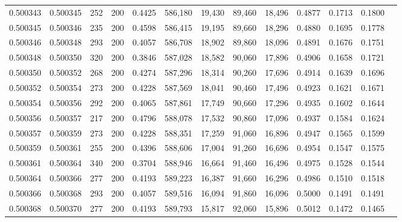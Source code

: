 \begin{tabular}{rrrrrrrrrrrrr}
0.500343 & 0.500345 &    252 & 200 &                                     0.4425 & 586,180 &  19,430 &  89,460 &  18,496 & 0.4877 & 0.1713 & 0.1800 \\
0.500345 & 0.500346 &    235 & 200 &                                     0.4598 & 586,415 &  19,195 &  89,660 &  18,296 & 0.4880 & 0.1695 & 0.1778 \\
0.500346 & 0.500348 &    293 & 200 &                                     0.4057 & 586,708 &  18,902 &  89,860 &  18,096 & 0.4891 & 0.1676 & 0.1751 \\
0.500348 & 0.500350 &    320 & 200 &                                     0.3846 & 587,028 &  18,582 &  90,060 &  17,896 & 0.4906 & 0.1658 & 0.1721 \\
0.500350 & 0.500352 &    268 & 200 &                                     0.4274 & 587,296 &  18,314 &  90,260 &  17,696 & 0.4914 & 0.1639 & 0.1696 \\
0.500352 & 0.500354 &    273 & 200 &                                     0.4228 & 587,569 &  18,041 &  90,460 &  17,496 & 0.4923 & 0.1621 & 0.1671 \\
0.500354 & 0.500356 &    292 & 200 &                                     0.4065 & 587,861 &  17,749 &  90,660 &  17,296 & 0.4935 & 0.1602 & 0.1644 \\
0.500356 & 0.500357 &    217 & 200 &                                     0.4796 & 588,078 &  17,532 &  90,860 &  17,096 & 0.4937 & 0.1584 & 0.1624 \\
0.500357 & 0.500359 &    273 & 200 &                                     0.4228 & 588,351 &  17,259 &  91,060 &  16,896 & 0.4947 & 0.1565 & 0.1599 \\
0.500359 & 0.500361 &    255 & 200 &                                     0.4396 & 588,606 &  17,004 &  91,260 &  16,696 & 0.4954 & 0.1547 & 0.1575 \\
0.500361 & 0.500364 &    340 & 200 &                                     0.3704 & 588,946 &  16,664 &  91,460 &  16,496 & 0.4975 & 0.1528 & 0.1544 \\
0.500364 & 0.500366 &    277 & 200 &                                     0.4193 & 589,223 &  16,387 &  91,660 &  16,296 & 0.4986 & 0.1510 & 0.1518 \\
0.500366 & 0.500368 &    293 & 200 &                                     0.4057 & 589,516 &  16,094 &  91,860 &  16,096 & 0.5000 & 0.1491 & 0.1491 \\
0.500368 & 0.500370 &    277 & 200 &                                     0.4193 & 589,793 &  15,817 &  92,060 &  15,896 & 0.5012 & 0.1472 & 0.1465 \\

\end{tabular}
